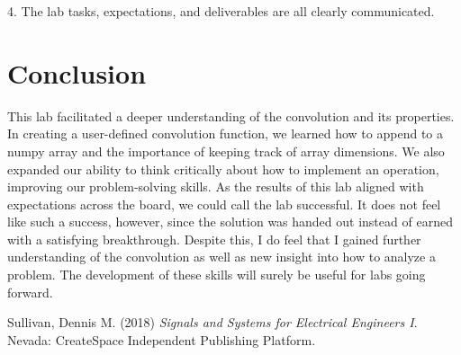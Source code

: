 \documentclass[12pt]{report}
\begin{document}
4. The lab tasks, expectations, and deliverables are all clearly communicated. \\
	
\section{Conclusion}
	
This lab facilitated a deeper understanding of the convolution and its properties.  In creating a user-defined convolution function, we learned how to append to a numpy array and the importance of keeping track of array dimensions. We also expanded our ability to think critically about how to implement an operation, improving our problem-solving skills. As the results of this lab aligned with expectations across the board, we could call the lab successful. It does not feel like such a success, however, since the solution was handed out instead of earned with a satisfying breakthrough. Despite this, I do feel that I gained further understanding of the convolution as well as new insight into how to analyze a problem. The development of these skills will surely be useful for labs going forward.

\newpage
\begin{thebibliography}{111}
		
Sullivan, Dennis M. (2018) {\it  Signals and Systems for Electrical Engineers I}. Nevada: CreateSpace Independent Publishing Platform.
		
		
\end{thebibliography}
\end{document}
